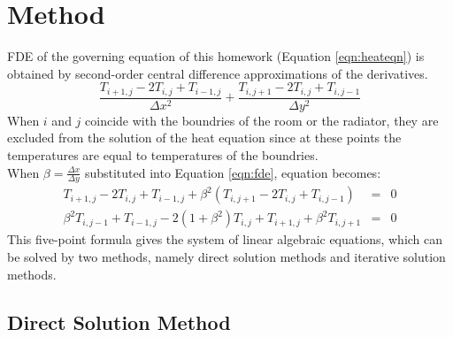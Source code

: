 \documentclass[letterpaper,12pt]{article}
\begin{document}
\section{Method}
FDE of the governing equation of this homework (Equation \ref{eqn:heateqn}) is obtained by second-order central difference approximations of the derivatives.
\begin{equation}
	\frac{T_{i+1,j}-2T_{i,j}+T_{i-1,j}}{\Delta x^2}+\frac{T_{i,j+1}-2T_{i,j}+T_{i,j-1}}{\Delta y^2}
	\label{eqn:fde}
\end{equation}
When $i$ and $j$ coincide with the boundries of the room or the radiator, they are excluded
from the solution of the heat equation since at these points the temperatures are equal to
temperatures of the boundries.\\
When $\beta = \frac{\Delta x}{\Delta y}$ substituted into Equation \ref{eqn:fde}, equation becomes:
\begin{eqnarray}
	T_{i+1,j}-2T_{i,j}+T_{i-1,j}+\beta ^2(T_{i,j+1}-2T_{i,j}+T_{i,j-1})&=&0 \nonumber \\
	\beta^2T_{i,j-1}+T_{i-1,j}-2(1+\beta^2)T_{i,j}+T_{i+1,j}+\beta ^2T_{i,j+1}&=&0 
	\label{eqn:basic}
\end{eqnarray}
This five-point formula gives the system of linear algebraic equations, which can be solved by two methods,
namely direct solution methods and iterative solution methods.
\subsection{Direct Solution Method}
\end{document}
